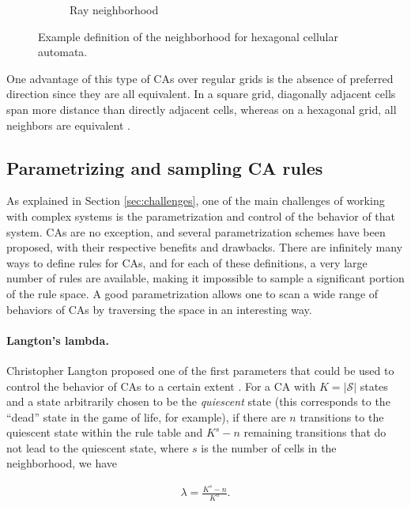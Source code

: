 \begin{figure}[htbp]
\begin{subfigure}[b]{.35\linewidth}
    \caption{Ray neighborhood}
    \label{fig:hexagonal_2}
  \end{subfigure}
  \caption{Example definition of the neighborhood for hexagonal cellular automata.}
\label{fig:hexagonal}
\end{figure}

One advantage of this type of \acp{CA} over regular grids is the absence of
preferred direction since they are all equivalent. In a square grid, diagonally
adjacent cells span more distance than directly adjacent cells, whereas on a   
hexagonal grid, all neighbors are equivalent
\parencite{moreeHexagonalSquareLattice2004}.

\subsection{Parametrizing and sampling CA rules}
As explained in Section \ref{sec:challenges}, one of the main challenges of
working with complex systems is the parametrization and control of the behavior
of that system. \acp{CA} are no exception, and several parametrization schemes
have been proposed, with their respective benefits and drawbacks. There are
infinitely many ways to define rules for \acp{CA}, and for each of these
definitions, a very large number of rules are available, making it impossible to
sample a significant portion of the rule space. A good parametrization allows one 
to scan a wide range of behaviors of \acp{CA} by traversing the space in an
interesting way.

\paragraph{Langton's lambda\label{sec:langtons-lambda}.}

Christopher Langton proposed one of the first parameters that could be used to
control the behavior of \acp{CA} to a certain extent
\parencite{langtonStudyingArtificialLife1986, langtonComputationEdgeChaos1990}.
For a \ac{CA} with $K = |\mathcal{S}|$ states and a state arbitrarily chosen to
be the \emph{quiescent} state (this corresponds to the ``dead'' state in the
game of life, for example), if there are $n$ transitions to the quiescent state
within the rule table and $K^{s} - n$ remaining transitions that do not lead to
the quiescent state, where $s$ is the number of cells in the neighborhood, we
have

\begin{equation}
  \label{eq:langton}
  \begin{aligned}
    \lambda = \frac{K^{s} - n}{K^{n}}.
  \end{aligned}
\end{equation}

